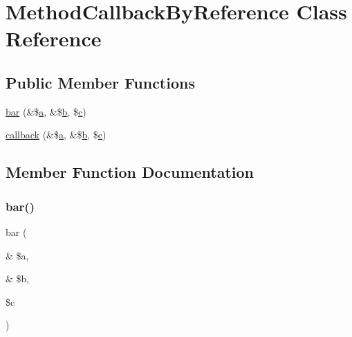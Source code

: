 \hypertarget{class_method_callback_by_reference}{}\section{Method\+Callback\+By\+Reference Class Reference}
\label{class_method_callback_by_reference}
\subsection*{Public Member Functions}
\begin{DoxyCompactItemize}
\item 
\mbox{\hyperlink{class_method_callback_by_reference_aa8aea0cda01b18b7d5e016a2355adcfc}{bar}} (\&\$\mbox{\hyperlink{interfacea}{a}}, \&\$\mbox{\hyperlink{interfaceb}{b}}, \$\mbox{\hyperlink{classc}{c}})
\item 
\mbox{\hyperlink{class_method_callback_by_reference_a7885c66bee87d7d844ebbf839d8ab0a3}{callback}} (\&\$\mbox{\hyperlink{interfacea}{a}}, \&\$\mbox{\hyperlink{interfaceb}{b}}, \$\mbox{\hyperlink{classc}{c}})
\end{DoxyCompactItemize}


\subsection{Member Function Documentation}
\mbox{\label{class_method_callback_by_reference_aa8aea0cda01b18b7d5e016a2355adcfc}} 
\subsubsection{\texorpdfstring{bar()}{bar()}}
{\footnotesize\ttfamily bar (\begin{DoxyParamCaption}\item[{\&}]{\$a,  }\item[{\&}]{\$b,  }\item[{}]{\$c }\end{DoxyParamCaption})}

\mbox{\label{class_method_callback_by_reference_a7885c66bee87d7d844ebbf839d8ab0a3}} 
